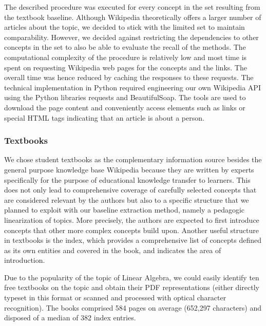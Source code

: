 \documentclass{article}
\begin{document}
The described procedure was executed for every concept in the set resulting from the textbook baseline. Although Wikipedia theoretically offers a larger number of articles about the topic, we decided to stick with the limited set to maintain comparability. However, we decided against restricting the dependencies to other concepts in the set to also be able to evaluate the recall of the methods. The computational complexity of the procedure is relatively low and most time is spent on requesting Wikipedia web pages for the concepts and the links. The overall time was hence reduced by caching the responses to these requests. The technical implementation in Python required engineering our own Wikipedia API using the Python libraries requests and BeautifulSoap. The tools are used to download the page content and conveniently access elements such as links or special HTML tags indicating that an article is about a person.

\subsubsection{Textbooks}
We chose student textbooks as the complementary information source besides the general purpose knowledge base Wikipedia because they are written by experts specifically for the purpose of educational knowledge transfer to learners. This does not only lead to comprehensive coverage of carefully selected concepts that are considered relevant by the authors but also to a specific structure that we planned to exploit with our baseline extraction method, namely a pedagogic linearization of topics. More precisely, the authors are expected to first introduce concepts that other more complex concepts build upon. Another useful structure in textbooks is the index, which provides a comprehensive list of concepts defined as its own entities and covered in the book, and indicates the area of introduction.

Due to the popularity of the topic of Linear Algebra, we could easily identify ten free textbooks on the topic and obtain their PDF representations (either directly typeset in this format or scanned and processed with optical character recognition). The books comprised 584 pages on average (652,297 characters) and disposed of a median of 382 index entries.

\end{document}
